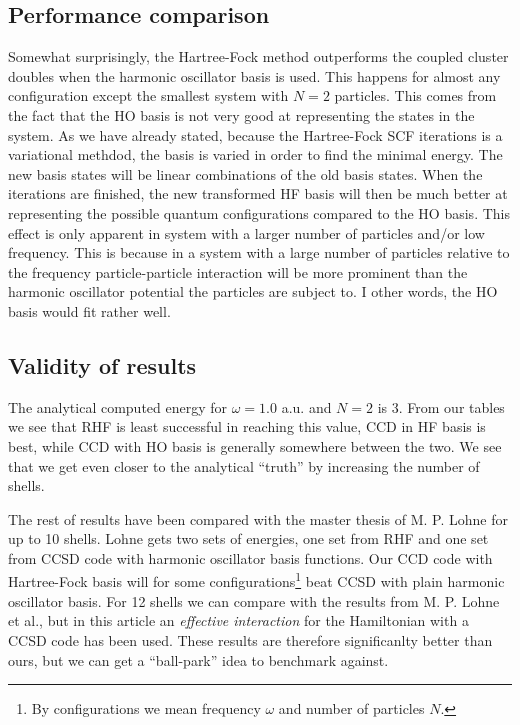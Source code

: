 \documentclass[
    a4paper, aps, twocolumn, floatfix, superscriptaddress,
    nofootinbib]{revtex4-1}
\newcommand{\1}{\mathds{1}}
\begin{document}
    \subsection{Performance comparison}
        Somewhat surprisingly, the Hartree-Fock method outperforms the coupled
        cluster doubles when the harmonic oscillator basis is used. This
        happens for almost any configuration except the smallest system
        with $N=2$ particles. This comes from the fact that the HO basis is 
        not very good at representing the states in the system. As we have
        already stated, because the Hartree-Fock SCF iterations is a variational
        methdod, the basis is varied in order to find the minimal energy. The new
        basis states will be linear combinations of the old basis states. When
        the iterations are finished, the new transformed HF basis will then be 
        much better at representing the possible quantum configurations compared 
        to the HO basis. This effect is only apparent in system with a larger
        number of particles and/or low frequency. This is because in a system with 
        a large number of particles relative to the frequency particle-particle
        interaction will be more prominent than the harmonic oscillator potential
        the particles are subject to. I other words, the HO basis would fit rather
        well. 

    \subsection{Validity of results}
        The analytical computed energy for $\omega=1.0$ a.u.
        and $N=2$ is $3$\cite{taut1994two}. From our tables we see 
        that RHF is least successful in reaching this value, CCD in
        HF basis is best, while CCD with HO basis is generally somewhere 
        between the two. We see that we get even closer to the analytical
        ``truth'' by increasing the number of shells.

        The rest of results have been compared with the master thesis of M. P.
        Lohne\cite{lohne2010coupled} for up to 10 shells. Lohne gets two sets of
        energies, one set from RHF and one set from CCSD code with harmonic
        oscillator basis functions. Our CCD code with Hartree-Fock basis will
        for some configurations\footnote{By configurations we mean frequency
        $\omega$ and number of particles $N$.} beat CCSD with plain harmonic
        oscillator basis. For 12 shells we can compare with the results from M.
        P. Lohne et al.\cite{lohne2011ab}, but in this article an
        \emph{effective interaction} for the Hamiltonian with a CCSD code has
        been used. These results are therefore significanlty better than ours,
        but we can get a ``ball-park'' idea to benchmark against.
\end{document}
